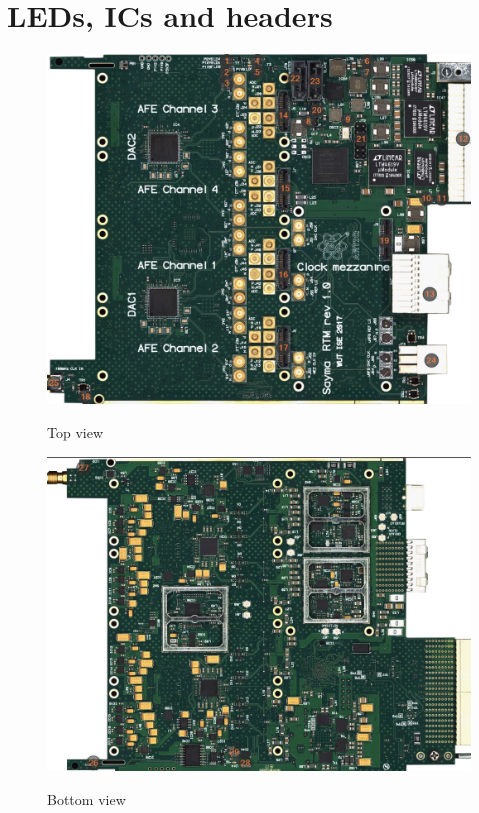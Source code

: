 \section{LEDs, ICs and headers}


		
		\begin{figure}[htbp!]
			\centering
			\includegraphics[width=12cm]{img/CalloutTop.png}\\
			\caption{Top view}
		\end{figure}
		
		\begin{figure}[htbp!]
			\centering
			\includegraphics[width=12cm]{img/CalloutBot.png}\\
			\caption{Bottom view}
		\end{figure}
\clearpage

